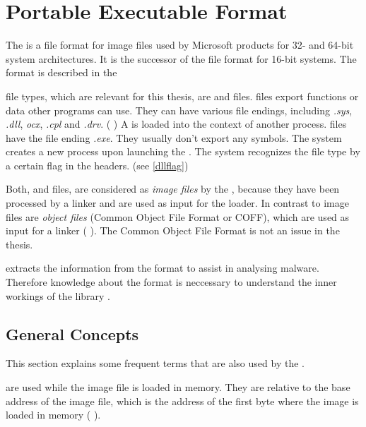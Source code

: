 \chapter{Portable Executable Format} \label{chap:peformat}

The \PE{} is a file format for image files used by Microsoft products for 32- and 64-bit system architectures. It is the successor of the \NZ{} file format for 16-bit systems. The \PE{} format is described in the \PECOFF{} \cite{pespec}

\PE{} file types, which are relevant for this thesis, are \DLL{} and \EXE{} files. \DLL{} files export functions or data other programs can use. They can have various file endings, including \emph{.sys}, \emph{.dll}, \emph{ocx}, \emph{.cpl} and \emph{.drv}. (\cf{} \cite{micrdll}) A \DLL{} is loaded into the context of another process.
\EXE{} files have the file ending \emph{.exe}. They usually don't export any symbols. The system creates a new process upon launching the \EXE{}.
The system recognizes the file type by a certain flag in the \PE{} headers. (see \ref{dllflag}) 

Both, \EXE{} and \DLL{} files, are considered as \emph{image files} by the \PECOFF{}, because they have been processed by a linker and are used as input for the loader. In contrast to image files are \emph{object files} (Common Object File Format or {COFF}), which are used as input for a linker (\cf{} \cite[]{pespec}). The Common Object File Format is not an issue in the thesis.

\portex{} extracts the information from the \PE{} format to assist in analysing malware. Therefore knowledge about the \PE{} format is neccessary to understand the inner workings of the library \portex{}. 

\section{General Concepts}


This section explains some frequent terms that are also used by the \PECOFF{}. 

\begin{definition}[RVA]
\emph{\RVA{}} are used while the image file is loaded in memory. They are relative to the base address of the image file, which is the address of the first byte where the image is loaded in memory (\cf{} \cite[]{pespec}). 
\end{definition} 

